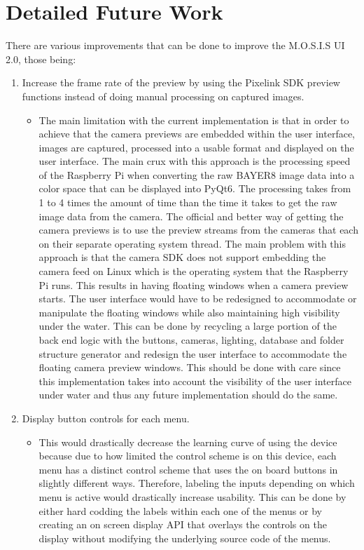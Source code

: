 \section{Detailed Future Work}
There are various improvements that can be done to improve the M.O.S.I.S UI 2.0, those being:
\begin{enumerate}
	\item Increase the frame rate of the preview by using the Pixelink SDK preview functions instead of doing manual processing on captured images.
          \begin{itemize}
            \item The main limitation with the current implementation is that in order to achieve that the camera previews are embedded within the user interface, images are captured, processed into a usable format and displayed on the user interface. The main crux with this approach is the processing speed of the Raspberry Pi when converting the raw BAYER8 image data into a color space that can be displayed into PyQt6. The processing takes from 1 to 4 times the amount of time than the time it takes to get the raw image data from the camera. The official and better way of getting the camera previews is to use the preview streams from the cameras that each on their separate operating system thread. The main problem with this approach is that the camera SDK does not support embedding the camera feed on Linux which is the operating system that the Raspberry Pi runs. This results in having floating windows when a camera preview starts. The user interface would have to be redesigned to accommodate or manipulate the floating windows while also maintaining high visibility under the water. This can be done by recycling a large portion of the back end logic with the buttons, cameras, lighting, database and folder structure generator and redesign the user interface to accommodate the floating camera preview windows. This should be done with care since this implementation takes into account the visibility of the user interface under water and thus any future implementation should do the same.
          \end{itemize}
	\item Display button controls for each menu.
          \begin{itemize}
            \item This would drastically decrease the learning curve of using the device because due to how limited the control scheme is on this device, each menu has a distinct control scheme that uses the on board buttons in slightly different ways. Therefore, labeling the inputs depending on which menu is active would drastically increase usability. This can be done by either hard codding the labels within each one of the menus or by creating an on screen display API that overlays the controls on the display without modifying the underlying source code of the menus.

\end{itemize}
\end{enumerate}
